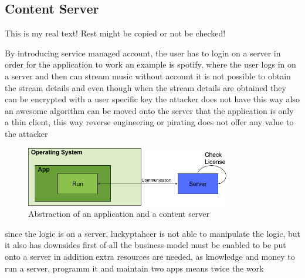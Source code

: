 \subsection{Content Server} \label{subsection:counter-replace-server}
This is my real text! Rest might be copied or not be checked!

By introducing service managed account, the user has to login on a server in order for the application to work
an example is spotify, where the user logs in on a server and then can stream music
without account it is not possible to obtain the stream details and even though when the stream details are obtained they can be encrypted with a user specific key the attacker does not have
this way also an awesome algorithm can be moved onto the server that the application is only a thin client, this way reverse engineering or pirating does not offer any value to the attacker


\begin{figure}[h]
    \centering
    \includegraphics[width=0.8\textwidth]{data/contentServer.png}
    \caption{Abstraction of an application and a content server}
    \label{fig:contentServer}
\end{figure}


since the logic is on a server, luckyptahcer is not able to manipulate the logic, but it also has downsides
first of all the business model must be enabled to be put onto a server
in addition extra resources are needed, as knowledge and money to run a server, programm it and maintain two apps means twice the work

